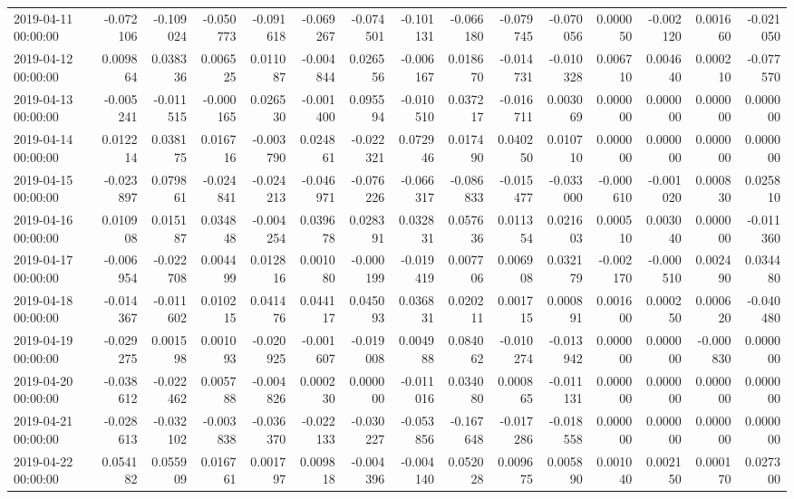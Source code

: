 \begin{tabular}{lrrrrrrrrrrrrrr}
2019-04-11 00:00:00 & -0.072106 & -0.109024 & -0.050773 & -0.091618 & -0.069267 & -0.074501 & -0.101131 & -0.066180 & -0.079745 & -0.070056 & 0.000050 & -0.002120 & 0.001660 & -0.021050 \\
2019-04-12 00:00:00 & 0.009864 & 0.038336 & 0.006525 & 0.011087 & -0.004844 & 0.026556 & -0.006167 & 0.018670 & -0.014731 & -0.010328 & 0.006710 & 0.004640 & 0.000210 & -0.077570 \\
2019-04-13 00:00:00 & -0.005241 & -0.011515 & -0.000165 & 0.026530 & -0.001400 & 0.095594 & -0.010510 & 0.037217 & -0.016711 & 0.003069 & 0.000000 & 0.000000 & 0.000000 & 0.000000 \\
2019-04-14 00:00:00 & 0.012214 & 0.038175 & 0.016716 & -0.003790 & 0.024861 & -0.022321 & 0.072946 & 0.017490 & 0.040250 & 0.010710 & 0.000000 & 0.000000 & 0.000000 & 0.000000 \\
2019-04-15 00:00:00 & -0.023897 & 0.079861 & -0.024841 & -0.024213 & -0.046971 & -0.076226 & -0.066317 & -0.086833 & -0.015477 & -0.033000 & -0.000610 & -0.001020 & 0.000830 & 0.025810 \\
2019-04-16 00:00:00 & 0.010908 & 0.015187 & 0.034848 & -0.004254 & 0.039678 & 0.028391 & 0.032831 & 0.057636 & 0.011354 & 0.021603 & 0.000510 & 0.003040 & 0.000000 & -0.011360 \\
2019-04-17 00:00:00 & -0.006954 & -0.022708 & 0.004499 & 0.012816 & 0.001080 & -0.000199 & -0.019419 & 0.007706 & 0.006908 & 0.032179 & -0.002170 & -0.000510 & 0.002490 & 0.034480 \\
2019-04-18 00:00:00 & -0.014367 & -0.011602 & 0.010215 & 0.041476 & 0.044117 & 0.045093 & 0.036831 & 0.020211 & 0.001715 & 0.000891 & 0.001600 & 0.000250 & 0.000620 & -0.040480 \\
2019-04-19 00:00:00 & -0.029275 & 0.001598 & 0.001093 & -0.020925 & -0.001607 & -0.019008 & 0.004988 & 0.084062 & -0.010274 & -0.013942 & 0.000000 & 0.000000 & -0.000830 & 0.000000 \\
2019-04-20 00:00:00 & -0.038612 & -0.022462 & 0.005788 & -0.004826 & 0.000230 & 0.000000 & -0.011016 & 0.034080 & 0.000865 & -0.011131 & 0.000000 & 0.000000 & 0.000000 & 0.000000 \\
2019-04-21 00:00:00 & -0.028613 & -0.032102 & -0.003838 & -0.036370 & -0.022133 & -0.030227 & -0.053856 & -0.167648 & -0.017286 & -0.018558 & 0.000000 & 0.000000 & 0.000000 & 0.000000 \\
2019-04-22 00:00:00 & 0.054182 & 0.055909 & 0.016761 & 0.001797 & 0.009818 & -0.004396 & -0.004140 & 0.052028 & 0.009675 & 0.005890 & 0.001040 & 0.002150 & 0.000170 & 0.027300 \\

\end{tabular}
